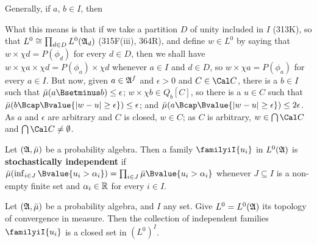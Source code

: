 {Generally, if $a$, $b\in I$, then
     
     
\noindent 
What this means is that if we take a partition $D$ of unity included in
$I$ (313K), so that $L^0\cong\prod_{d\in D}L^0(\frak A_d)$ (315F(iii),
364R), and define $w\in L^0$ by saying that $w\times\chi d=P(\phi_d)$
for every $d\in D$, then we shall have
$w\times\chi a\times\chi d=P(\phi_a)\times\chi d$ whenever $a\in I$ and 
$d\in D$, so $w\times\chi a=P(\phi_a)$ for
every $a\in I$.   But now, given $a\in\frak A^f$ and $\epsilon>0$ and
$C\in\Cal C$, there is a $b\in I$ such that
$\bar\mu(a\Bsetminus b)\le\epsilon$;
$w\times\chi b\in\overline{Q_b[C]}$, so there is a
$u\in C$ such that
$\bar\mu(b\Bcap\Bvalue{|w-u|\ge\epsilon})\le\epsilon$;  and
$\bar\mu(a\Bcap\Bvalue{|w-u|\ge\epsilon})\le2\epsilon$.   As $a$ and
$\epsilon$ are arbitrary and $C$ is closed, $w\in C$;  as $C$ is
arbitrary, $w\in\bigcap\Cal C$ and $\bigcap\Cal C\ne\emptyset$.
}%
     
   Let $(\frak A,\bar\mu)$ be a probability algebra.   Then a
family $\familyiI{u_i}$ in $L^0(\frak A)$ is {\bf stochastically
independent}
if $\bar\mu(\inf_{i\in J}\Bvalue{u_i>\alpha_i})
=\prod_{i\in J}\bar\mu\Bvalue{u_i>\alpha_i}$ whenever $J\subseteq I$ is
a non-empty finite set and $\alpha_i\in\Bbb R$ for every $i\in I$.
   
     
\medskip
     
 Let $(\frak A,\bar\mu)$ be a probability
algebra, and $I$ any set.   Give $L^0=L^0(\frak A)$ its topology of
convergence in measure.   Then the collection of independent families
$\familyiI{u_i}$ is a closed set in $(L^0)^I$.
     
